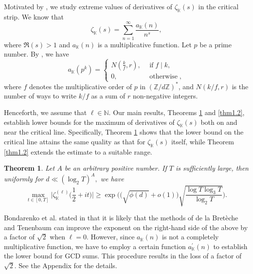 \documentclass[12pt,reqno]{amsart}
\newtheorem{thm}{Theorem}[section]
\theoremstyle{definition}
\numberwithin{equation}{section}
\newcommand{\mbk}{\mathbb{K}}
\newcommand{\mbz}{\mathbb{Z}}
\newcommand{\mbn}{\mathbb{N}}
\begin{document}
\par
Motivated by 
 \cite{bondarenko2023dichotomy,yang2022extreme}, we study extreme values of derivatives of $\zeta_\mbk(s)$ in the critical strip. We know that
$$\zeta_{\mbk}(s) = \sum_{n=1}^{\infty}\frac{a_{\mbk}(n)}{n^s},$$
where $\Re(s) > 1$ and $a_{\mbk}(n)$ is a multiplicative function. Let $p$ be a prime number. By \cite{washington1997introduction}, we have
\begin{equation*}
    a_{\mbk}(p^k) = 
    \begin{cases}
        N(\frac{k}{f},r), &\, \operatorname{if} f \mid k, \\
        0, &\, \operatorname{otherwise},
     \end{cases}
\end{equation*}
where $f$ denotes the multiplicative order of $p$ in $(\mbz/d\mbz)^*$, and $N(k/f,r)$ is the number of ways to write $k/f$ as a sum of $r$ non-negative integers.
\par
Henceforth, we assume that $\ell \in \mbn$. Our main results, Theorems \ref{thm1.1} and \ref{thm1.2}, establish lower bounds for the maximum of derivatives of $\zeta_\mbk(s)$ both on and near the critical line. Specifically, Theorem \ref{thm1.1} shows that the lower bound on the critical line attains the same quality as that for $\zeta_\mbk(s)$ itself, while Theorem \ref{thm1.2} extends the estimate to a suitable range.
\begin{thm}
    \label{thm1.1}
   Let $A$ be an arbitrary positive number. If $T$ is sufficiently large, then uniformly for $d \ll (\log_2 T)^A,$ we have
     $$
\max_{t\in[0,T]}\Big|\zeta_{\mbk}^{(\ell)}\Big(\frac{1}{2}+it\Big)\Big| \ge \exp\bigg(\Big(\sqrt{\phi(d)} + o(1)\Big)\sqrt{\frac{\log T\log_3 T}{\log_2 T}}\bigg).
     $$
\end{thm}
\par
Bondarenko et al. stated in \cite{bondarenko2023dichotomy} that it is likely that the methods of de la Bretèche and Tenenbaum \cite{tenen2019galsum} can improve the exponent on
the right-hand side of the above by a factor of $\sqrt{2}$ when $\ell = 0$. However, since $a_\mbk(n)$ is not a completely multiplicative function, we have to employ a certain function $a_\mbk^\prime(n)$ to establish the lower bound for GCD sums. This procedure results in the loss of a factor of $\sqrt{2}$. See the Appendix for the details.
\par
\end{document}
